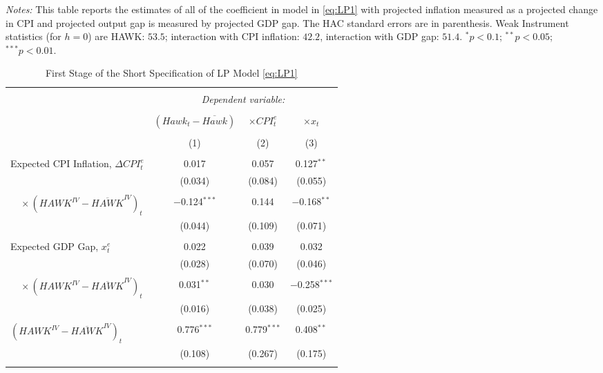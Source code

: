 \documentclass[11pt]{article}
\begin{document}
\begin{table}[!htbp]
\begin{threeparttable}
  \begin{tablenotes}[flushleft]\scriptsize
\item[] \textit{Notes:} This table reports the estimates of all of the coefficient in model in \vref{eq:LP1} with projected inflation measured as a projected change in CPI and projected output gap is measured by projected GDP gap. The \citet{Andrews1991} HAC standard errors are in parenthesis. Weak Instrument statistics (for $h=0$) are HAWK: $53.5$; interaction with CPI inflation: $42.2$, interaction with GDP gap: $51.4$. $^{*}p<0.1$; $^{**}p<0.05$; $^{***}p<0.01$.
\end{tablenotes}
\end{threeparttable}
  \end{table} 

  \begin{table}[!htbp] \centering \scriptsize
    \begin{threeparttable}
    \caption{First Stage of the Short Specification of LP Model \eqref{eq:LP1}} 
    \label{tab:fs_short} 
  \begin{tabular}{@{\extracolsep{5pt}}lccc} 
  \\[-1.8ex]\hline 
  \hline \\[-1.8ex] 
   & \multicolumn{3}{c}{\textit{Dependent variable:}} \\ 
  \cline{2-4} 
  \\[-1.8ex] & $\left(\mathit{Hawk}_t-\overline{\mathit{Hawk}}\right)$ &  $\times \mathit{CPI}_t^e$ & $\times x_{t}$ \\ 
  \\[-1.8ex] & (1) & (2) & (3)\\ 
  \hline \\[-1.8ex] 
  Expected CPI Inflation, $\Delta\mathit{CPI}_t^e$ & 0.017 & 0.057 & 0.127$^{**}$ \\ 
    & (0.034) & (0.084) & (0.055) \\ 
    & & & \\ 
    $\quad\times\left(\mathit{HAWK}^\mathit{IV}-\overline{\mathit{HAWK}}^\mathit{IV}\right)_t$ & $-$0.124$^{***}$ & 0.144 & $-$0.168$^{**}$ \\ 
    & (0.044) & (0.109) & (0.071) \\ 
    & & & \\ 
    Expected GDP Gap, $x_{t}^e$  & 0.022 & 0.039 & 0.032 \\ 
    & (0.028) & (0.070) & (0.046) \\ 
    & & & \\ 
    $\quad\times\left(\mathit{HAWK}^\mathit{IV}-\overline{\mathit{HAWK}}^\mathit{IV}\right)_t$ & 0.031$^{**}$ & 0.030 & $-$0.258$^{***}$ \\ 
    & (0.016) & (0.038) & (0.025) \\ 
    & & & \\ 
   $\left(\mathit{HAWK}^\mathit{IV}-\overline{\mathit{HAWK}}^\mathit{IV}\right)_t$ & 0.776$^{***}$ & 0.779$^{***}$ & 0.408$^{**}$ \\ 
    & (0.108) & (0.267) & (0.175) \\ 
    & & & \\ 


\end{tabular}
\end{threeparttable}
\end{table}
\end{document}

